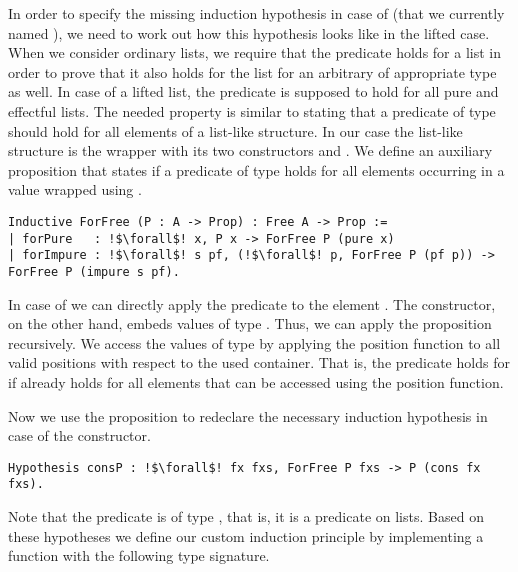 In order to specify the missing induction hypothesis in case of  (that we currently named ), we need to work out how this hypothesis looks like in the lifted case.
When we consider ordinary lists, we require that the predicate holds for a list  in order to prove that it also holds for the list  for an arbitrary  of appropriate type as well.
In case of a lifted list, the predicate is supposed to hold for all
pure and effectful lists.
The needed property is similar to stating that a predicate of type  should hold for all elements of a list\--like structure.
In our case the list\--like structure is the  wrapper with its two constructors  and .
We define an auxiliary proposition  that states if a predicate of type  holds for all elements occurring in a value wrapped using .

\begin{verbatim}
Inductive ForFree (P : A -> Prop) : Free A -> Prop :=
| forPure   : !$\forall$! x, P x -> ForFree P (pure x)
| forImpure : !$\forall$! s pf, (!$\forall$! p, ForFree P (pf p)) -> ForFree P (impure s pf).
\end{verbatim}

In case of  we can directly apply the predicate to the element .
The  constructor, on the other hand, embeds values of type .
Thus, we can apply the proposition  recursively.
We access the values of type  by applying the position function to all valid positions with respect to the used container.
That is, the predicate holds for  if  already holds for all elements that can be accessed using the position function.

Now we use the proposition  to redeclare the necessary induction hypothesis in case of the  constructor.

\begin{verbatim}
Hypothesis consP : !$\forall$! fx fxs, ForFree P fxs -> P (cons fx fxs).
\end{verbatim}

Note that the predicate  is of type , that is, it is a predicate on lists.
Based on these hypotheses we define our custom induction principle by implementing a function with the following type signature.

